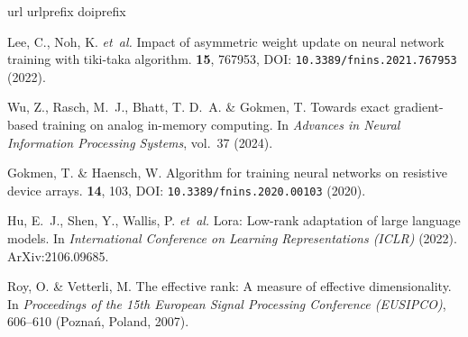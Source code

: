\documentclass[fleqn,10pt]{wlscirep}
\begin{document}
\begin{thebibliography}{10}
\expandafter\ifx\csname url\endcsname\relax
  \def\url#1{\texttt{#1}}\fi
\expandafter\ifx\csname urlprefix\endcsname\relax\def\urlprefix{URL }\fi
\expandafter\ifx\csname doiprefix\endcsname\relax\def\doiprefix{DOI: }\fi
\providecommand{\bibinfo}[2]{#2}
\providecommand{\eprint}[2][]{\url{#2}}

\bibinfo{author}{Lee, C.}, \bibinfo{author}{Noh, K.} \emph{et~al.}
\newblock \bibinfo{journal}{\bibinfo{title}{Impact of asymmetric weight update
  on neural network training with tiki-taka algorithm}}.
  \textbf{\bibinfo{volume}{15}}, \bibinfo{pages}{767953},
  \doiprefix\url{10.3389/fnins.2021.767953} (\bibinfo{year}{2022}).

\bibinfo{author}{Wu, Z.}, \bibinfo{author}{Rasch, M.~J.},
  \bibinfo{author}{Bhatt, T. D.~A.} \& \bibinfo{author}{Gokmen, T.}
\newblock \bibinfo{title}{Towards exact gradient-based training on analog
  in-memory computing}.
\newblock In \emph{\bibinfo{booktitle}{Advances in Neural Information
  Processing Systems}}, vol.~\bibinfo{volume}{37} (\bibinfo{year}{2024}).

\bibinfo{author}{Gokmen, T.} \& \bibinfo{author}{Haensch, W.}
\newblock \bibinfo{journal}{\bibinfo{title}{Algorithm for training neural
  networks on resistive device arrays}}.
  \textbf{\bibinfo{volume}{14}}, \bibinfo{pages}{103},
  \doiprefix\url{10.3389/fnins.2020.00103} (\bibinfo{year}{2020}).

\bibinfo{author}{Hu, E.~J.}, \bibinfo{author}{Shen, Y.},
  \bibinfo{author}{Wallis, P.} \emph{et~al.}
\newblock \bibinfo{title}{Lora: Low-rank adaptation of large language models}.
\newblock In \emph{\bibinfo{booktitle}{International Conference on Learning
  Representations (ICLR)}} (\bibinfo{year}{2022}).
\newblock \bibinfo{note}{ArXiv:2106.09685}.

\bibinfo{author}{Roy, O.} \& \bibinfo{author}{Vetterli, M.}
\newblock \bibinfo{title}{The effective rank: A measure of effective
  dimensionality}.
\newblock In \emph{\bibinfo{booktitle}{Proceedings of the 15th European Signal
  Processing Conference (EUSIPCO)}}, \bibinfo{pages}{606--610}
  (\bibinfo{address}{Pozna{\'n}, Poland}, \bibinfo{year}{2007}).


\end{thebibliography}
\end{document}
